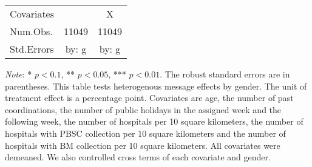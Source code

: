 \documentclass[12pt, a4paper]{article}
\begin{document}
\begin{table}[H]
\begin{threeparttable}
\begin{tabular}[t]{>{\raggedright\arraybackslash}p{30em}cc}
Covariates &  & X\\
Num.Obs. & \num{11049} & \num{11049}\\
Std.Errors & by: g & by: g\\
\bottomrule
\end{tabular}
\begin{tablenotes}
\item \emph{Note}: * $p < 0.1$, ** $p < 0.05$, *** $p < 0.01$. The robust standard errors are in parentheses. This table tests heterogenous message effects by gender. The unit of treatment effect is a percentage point. Covariates are age, the number of past coordinations, the number of public holidays in the assigned week and the following week, the number of hospitals per 10 square kilometers, the number of hospitals with PBSC collection per 10 square kilometers and the number of hospitals with BM collection per 10 square kilometers. All covariates were demeaned. We also controlled cross terms of each covariate and gender.
\end{tablenotes}
\end{threeparttable}
\end{table}
\end{document}
